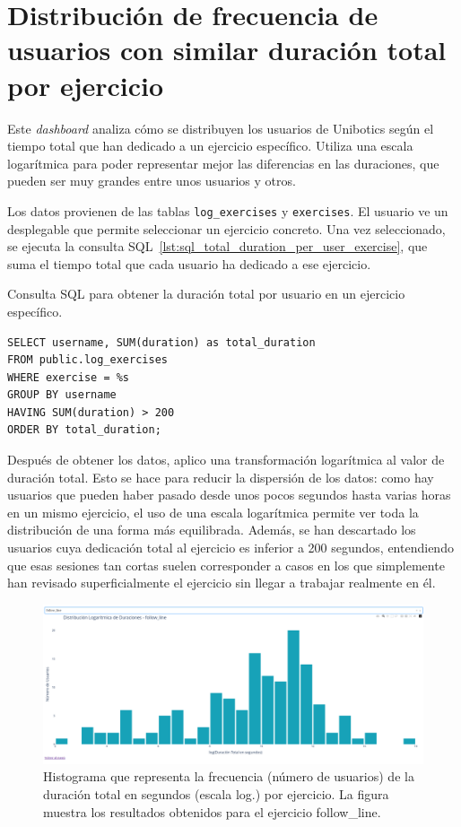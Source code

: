 \documentclass[a4paper, 12pt]{book}
\begin{document}
\section{Distribución de frecuencia de usuarios con similar duración total por ejercicio}
\label{sec:dash3a}

Este \textit{dashboard} analiza cómo se distribuyen los usuarios de Unibotics según el tiempo total que han dedicado a un ejercicio específico. Utiliza una escala logarítmica para poder representar mejor las diferencias en las duraciones, que pueden ser muy grandes entre unos usuarios y otros.

Los datos provienen de las tablas \texttt{log\_exercises} y \texttt{exercises}. El usuario ve un desplegable que permite seleccionar un ejercicio concreto. Una vez seleccionado, se ejecuta la consulta SQL~\ref{lst:sql_total_duration_per_user_exercise}, que suma el tiempo total que cada usuario ha dedicado a ese ejercicio.

\begin{listing}[h!]
\caption{Consulta SQL para obtener la duración total por usuario en un ejercicio específico.}
\label{lst:sql_total_duration_per_user_exercise}
\begin{verbatim}
SELECT username, SUM(duration) as total_duration
FROM public.log_exercises
WHERE exercise = %s
GROUP BY username
HAVING SUM(duration) > 200
ORDER BY total_duration;
\end{verbatim}
\end{listing}

Después de obtener los datos, aplico una transformación logarítmica al valor de duración total. Esto se hace para reducir la dispersión de los datos: como hay usuarios que pueden haber pasado desde unos pocos segundos hasta varias horas en un mismo ejercicio, el uso de una escala logarítmica permite ver toda la distribución de una forma más equilibrada. Además, se han descartado los usuarios cuya dedicación total al ejercicio es inferior a 200 segundos, entendiendo que esas sesiones tan cortas suelen corresponder a casos en los que simplemente han revisado superficialmente el ejercicio sin llegar a trabajar realmente en él.


\begin{figure}[H]
  \centering
  \includegraphics[width=1.1\textwidth]{img/3a.png}
  \caption{Histograma que representa la frecuencia (número de usuarios) de la duración total en segundos (escala log.) por ejercicio. La figura muestra los resultados obtenidos para el ejercicio follow\_line.}
  \label{fig:3a}
\end{figure}
\end{document}
